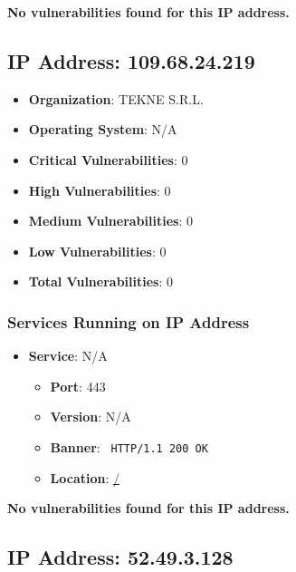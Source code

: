 \documentclass{article}
\begin{document}
\textbf{No vulnerabilities found for this IP address.}




\clearpage



\subsection*{IP Address: 109.68.24.219}

\begin{itemize}
    \item \textbf{Organization}: TEKNE S.R.L.
    \item \textbf{Operating System}:  N/A 
    \item \textbf{Critical Vulnerabilities}: 0
    \item \textbf{High Vulnerabilities}: 0
    \item \textbf{Medium Vulnerabilities}: 0
    \item \textbf{Low Vulnerabilities}: 0
    \item \textbf{Total Vulnerabilities}: 0
\end{itemize}

\subsubsection*{Services Running on IP Address}

\begin{itemize}
    
        \item \textbf{Service}: N/A
        \begin{itemize}
            \item \textbf{Port}: 443
            \item \textbf{Version}:  N/A 
            \item \textbf{Banner}: \texttt{
                HTTP/1.1 200 OK
            }
            \item \textbf{Location}: \href{ / }{ / }
        \end{itemize}
    
\end{itemize}


\textbf{No vulnerabilities found for this IP address.}




\clearpage



\subsection*{IP Address: 52.49.3.128}
\end{document}
